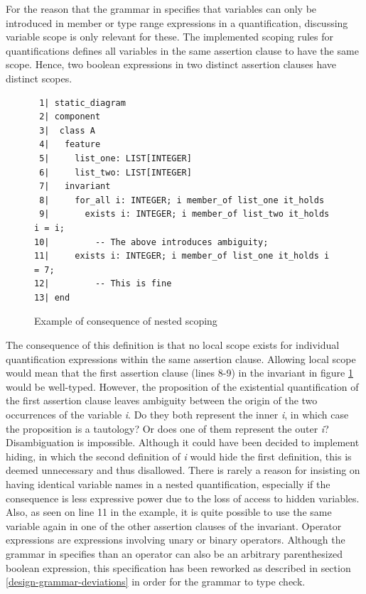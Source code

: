 For the reason that the grammar in \cite{walden1995} specifies that variables can only be introduced in member  or type range expressions in a quantification, discussing variable scope is only relevant for these. The implemented scoping rules for quantifications defines all variables in the same assertion clause to have the same scope. Hence, two boolean expressions in two distinct assertion clauses have distinct scopes.
\begin{figure}[H]
{\footnotesize
\begin{verbatim}
 1| static_diagram
 2| component
 3|  class A
 4|   feature
 5|     list_one: LIST[INTEGER]
 6|     list_two: LIST[INTEGER]
 7|   invariant
 8|     for_all i: INTEGER; i member_of list_one it_holds 
 9|       exists i: INTEGER; i member_of list_two it_holds i = i; 
10|         -- The above introduces ambiguity;
11|     exists i: INTEGER; i member_of list_one it_holds i = 7; 
12|         -- This is fine
13| end
\end{verbatim}
}
\caption{Example of consequence of nested scoping}
\label{fig:variable_scoping}
\end{figure}
The consequence of this definition is that no local scope exists for individual quantification expressions within the same assertion clause. Allowing local scope would mean that the first assertion clause (lines 8-9) in the invariant in figure \ref{fig:variable_scoping} would be well-typed. However, the proposition of the existential quantification of the first assertion clause leaves ambiguity between the origin of the two occurrences of the variable \textit{i}. Do they both represent the inner \textit{i}, in which case the proposition is a tautology? Or does one of them represent the outer \textit{i}? Disambiguation is impossible. Although it could have been decided to implement hiding, in which the second definition of \textit{i} would hide the first definition, this is deemed unnecessary and thus disallowed. There is rarely a reason for insisting on having identical variable names in a nested quantification, especially if the consequence is less expressive power due to the loss of access to hidden variables. Also, as seen on line 11 in the example, it is quite possible to use the same variable again in one of the other assertion clauses of the invariant.
Operator expressions are expressions involving unary or binary operators. Although the grammar in \cite{walden1995} specifies than an operator can also be an arbitrary parenthesized boolean expression, this specification has been reworked as described in section \ref{design-grammar-deviations} in order for the grammar to type check. 
